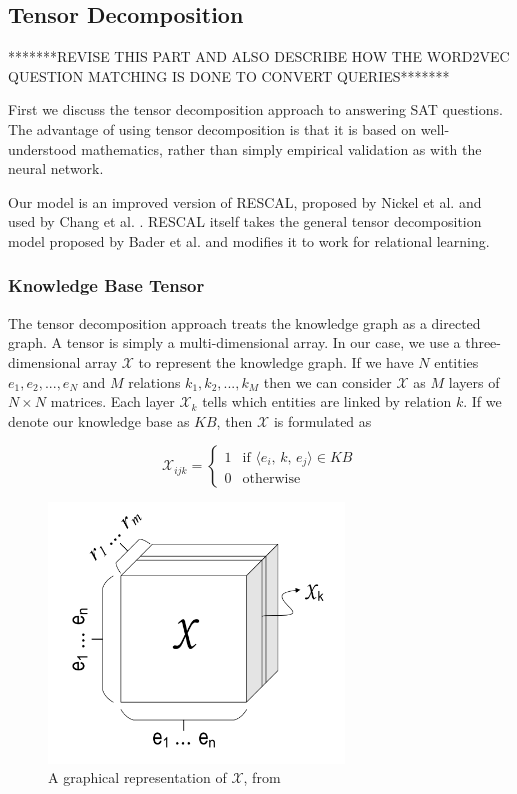 \documentclass[pageno]{final_paper}
\begin{document}
\subsection{Tensor Decomposition}
\label{Tensor Decomposition}

*******REVISE THIS PART AND ALSO DESCRIBE HOW THE WORD2VEC QUESTION MATCHING
IS DONE TO CONVERT QUERIES*******

First we discuss the tensor decomposition approach to answering SAT questions.
The advantage of using tensor decomposition is that it is based on
well-understood mathematics, rather than simply empirical validation as with the
neural network.

Our model is an improved version of RESCAL, proposed by Nickel et al.
\cite{Nickel2011} and used by Chang et al. \cite{Chang2014}. RESCAL itself takes
the general tensor decomposition model proposed by Bader et al. \cite{Bader2007}
and modifies it to work for relational learning. \\

\subsubsection{Knowledge Base Tensor}
\label{Knowledge Base Tensor}

The tensor decomposition approach treats the knowledge graph as a directed
graph. A tensor is simply a multi-dimensional array. In our case, we use a
three-dimensional array $\mathcal{X}$ to represent the knowledge graph. If we
have $N$ entities $e_1, e_2, ..., e_N$ and $M$ relations $k_1, k_2, ..., k_M$
then we can consider $\mathcal{X}$ as $M$ layers of $N\times N$ matrices. Each
layer $\mathcal{X}_k$ tells which entities are linked by relation $k$. If we
denote our knowledge base as $KB$, then $\mathcal{X}$ is formulated as

$$
\mathcal{X}_{ijk} =
\begin{cases}
    1 & \text{if } \langle e_i,\,k,\,e_j\rangle \in KB \\
    0 & \text{otherwise}
\end{cases}
$$

\begin{figure}[!tb]
    \centering
    \includegraphics[width=0.7\textwidth,keepaspectratio]{figures/tensor_figure.png}
    \caption{A graphical representation of $\mathcal{X}$, from \cite{Chang2014}}
    \label{fig: tensor figure}
\end{figure}
\end{document}
